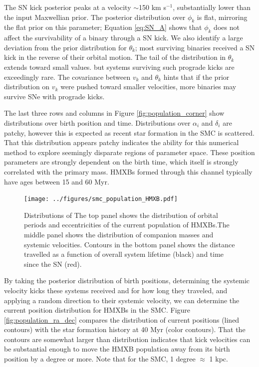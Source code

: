 \documentclass[12pt, preprint]{aastex}
\begin{document}
The SN kick posterior peaks at a velocity $\sim$150 km s$^{-1}$, substantially lower than the input Maxwellian prior. The posterior distribution over $\phi_k$ is flat, mirroring the flat prior on this parameter; Equation \ref{eq:SN_A} shows that $\phi_k$ does not affect the survivability of a binary through a SN kick. We also identify a large deviation from the prior distribution for $\theta_k$; most surviving binaries received a SN kick in the reverse of their orbital motion. The tail of the distribution in $\theta_k$ extends toward small values. but systems surviving such prograde kicks are exceedingly rare. The covariance between $v_k$ and $\theta_k$ hints that if the prior distribution on $v_k$ were pushed toward smaller velocities, more binaries may survive SNe with prograde kicks. 

The last three rows and columns in Figure \ref{fig:population_corner} show distributions over birth position and time. Distributions over $\alpha_i$ and $\delta_i$ are patchy, however this is expected as recent star formation in the SMC is scattered. That this distribution appears patchy indicates the ability for this numerical method to explore seemingly disparate regions of parameter space. These position parameters are strongly dependent on the birth time, which itself is strongly correlated with the primary mass. HMXBs formed through this channel typically have ages between 15 and 60 Myr.


\begin{figure}[h!]
\begin{center}
\texttt{[image: ../figures/smc\_population\_HMXB.pdf]}
\caption{ Distributions of The top panel shows the distribution of orbital periods and eccentricities of the current population of HMXBs.The middle panel shows the distribution of companion masses and systemic velocities. Contours in the bottom panel shows the distance travelled as a function of  overall system lifetime (black) and time since the SN (red). }
\label{fig:smc_population_HMXB}
\end{center}
\end{figure}


By taking the posterior distribution of birth positions, determining the systemic velocity kicks these systems received and for how long they traveled, and applying a random direction to their systemic velocity, we can determine the current position distribution for HMXBs in the SMC. Figure \ref{fig:population_ra_dec} compares the distribution of current positions (lined contours) with the star formation history at 40 Myr (color contours). That the contours are somewhat larger than distribution indicates that kick velocities can be substantial enough to move the HMXB population away from its birth position by a degree or more. Note that for the SMC, 1 degree $\approx$ 1 kpc.
\end{document}
